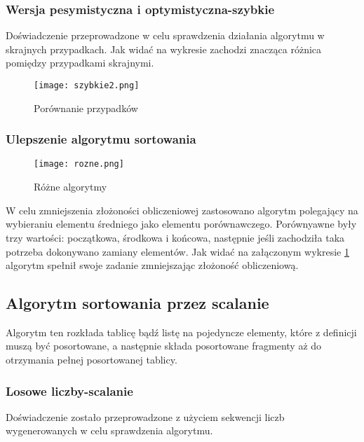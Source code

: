 \documentclass[12pt,a4paper,titlepage]{article}
\begin{document}
\subsubsection{Wersja pesymistyczna i optymistyczna-szybkie}
Doświadczenie przeprowadzone w celu sprawdzenia działania algorytmu w skrajnych przypadkach. Jak widać na wykresie zachodzi znacząca różnica pomiędzy przypadkami skrajnymi.

\begin{figure}[h]
\begin{center}
\texttt{[image: szybkie2.png]}
\caption{Porównanie przypadków}
\end{center}
\end{figure}

\subsubsection{Ulepszenie algorytmu sortowania}
\begin{figure}[h]
\begin{center}
\texttt{[image: rozne.png]}
\caption{Różne algorytmy}
\label{rozne}
\end{center}
\end{figure}


W celu zmniejszenia złożoności obliczeniowej zastosowano algorytm polegający na wybieraniu elementu średniego jako elementu porównawczego. Porównyawne były trzy wartości: początkowa, środkowa i końcowa, następnie jeśli zachodziła taka potrzeba dokonywano zamiany elementów. Jak widać na załączonym wykresie \ref{rozne} algorytm spełnił swoje zadanie zmniejszając złożoność obliczeniową.

\newpage
\newpage
\subsection{Algorytm sortowania przez scalanie}
Algorytm ten rozkłada tablicę bądź listę na pojedyncze elementy, które z definicji muszą być posortowane, a następnie składa posortowane fragmenty aż do otrzymania pełnej posortowanej tablicy.


\subsubsection{Losowe liczby-scalanie}
Doświadczenie zostało przeprowadzone z użyciem sekwencji liczb wygenerowanych w celu sprawdzenia algorytmu.
\end{document}
